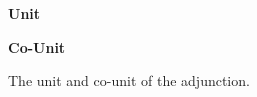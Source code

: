 \begin{figure}
    \centering
    \begin{minipage}{0.47\linewidth}
      \begin{framed}
        \centering
        \textbf{Unit}
  
      \end{framed}
    \end{minipage}
    \quad
    \begin{minipage}{0.47\linewidth}
      \begin{framed}
        \centering
        \textbf{Co-Unit}
  
      \end{framed}
    \end{minipage}

\caption{The unit and co-unit of the adjunction.}
    \label{UnitCoUnitDefinition}
\end{figure}




